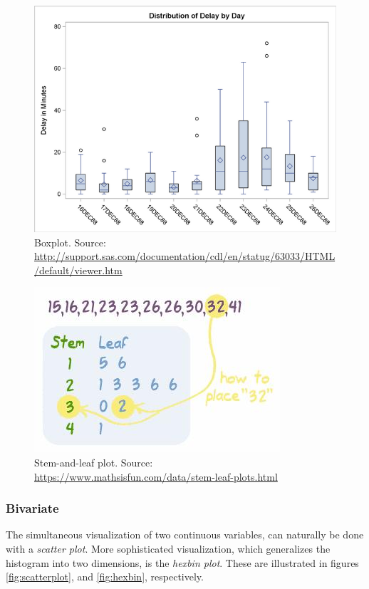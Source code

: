 \documentclass[12pt,a4paper]{report}
\begin{document}
\begin{figure}
\centering
\includegraphics[height=0.3\textheight]{art/ex6aout}
\caption[BoxPlot]{Boxplot. Source: \url{http://support.sas.com/documentation/cdl/en/statug/63033/HTML/default/viewer.htm}}
\label{fig:boxplot}
\end{figure}



\begin{figure}
\centering
\includegraphics[height=0.3\textheight]{art/stem_and_leaf}
\caption[Stem and Leaf Pot]{Stem-and-leaf plot. Source: \url{https://www.mathsisfun.com/data/stem-leaf-plots.html}}
\label{fig:stem_and_leaf}
\end{figure}




\subsubsection{Bivariate}
The simultaneous visualization of two continuous variables, can naturally be done with a \emph{scatter plot}.
More sophisticated visualization, which generalizes the histogram into two dimensions, is the \emph{hexbin plot}.  
These are illustrated in figures \ref{fig:scatterplot}, and \ref{fig:hexbin}, respectively. 
\end{document}
